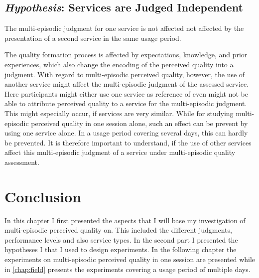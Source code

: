 \subsection{\emph{Hypothesis}: Services are Judged Independent}
\begin{hypothesis}\label{hypo:independent}
The multi-episodic judgment for one service is not affected not affected by the presentation of a second service in the same usage period.
\end{hypothesis}

The quality formation process is affected by expectations, knowledge, and prior experiences, which also change the encoding of the perceived quality into a judgment.
With regard to multi-episodic perceived quality, however, the use of another service might affect the multi-episodic judgment of the assessed service.
Here participants might either use one service as reference of even might not be able to attribute perceived quality to a service for the multi-episodic judgment.
This might especially occur, if services are very similar.
While for studying multi-episodic perceived quality in one session alone, such an effect can be prevent by using one service alone.
In a usage period covering several days, this can hardly be prevented.
It is therefore important to understand, if the use of other services affect this multi-episodic judgment of a service under multi-episodic quality assessment.

\section{Conclusion}
In this chapter I first presented the aspects that I will base my investigation of multi-episodic perceived quality on.
This included the different judgments, performance levels and also service types.
In the second part I presented the hypotheses I that I used to design experiments.
In the following chapter the experiments on multi-episodic perceived quality in one session are presented while in \autoref{chap:field} presents the experiments covering a usage period of multiple days.